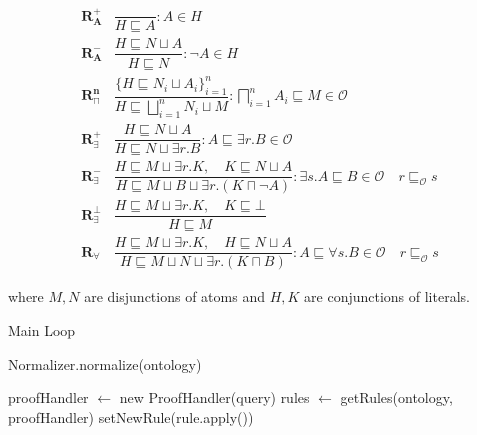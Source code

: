\documentclass[titlepage]{article}
\begin{document}
\begin{align}
  \mathbf{R^{+}_A} & \dfrac{}{H\sqsubseteq A} : A \in H \label{rules:RPlusA}\\
  \mathbf{R^{-}_A} & \dfrac{H \sqsubseteq N \sqcup A}{H \sqsubseteq N} : \neg A \in H  \label{rules:RMinusA}\\ 
  \mathbf{R^{n}_{\sqcap}} & \dfrac{\{H \sqsubseteq N_i \sqcup A_i \}^{n}_{i=1}}{H \sqsubseteq \bigsqcup^{n}_{i=1} N_i \sqcup M} : \bigsqcap^{n}_{i=1} A_i \sqsubseteq M \in \mathcal{O} \label{rules:RNAnd} \\
  \mathbf{R^+_{\exists}} & \dfrac{H \sqsubseteq N \sqcup A }{ H \sqsubseteq N \sqcup \exists r.B} : A \sqsubseteq \exists r.B \in \mathcal{O} \label{rules:RPlusExists}\\
  \mathbf{R^-_{\exists}} & \dfrac{H \sqsubseteq M \sqcup \exists r.K,\quad K \sqsubseteq N \sqcup A}{H \sqsubseteq M \sqcup B \sqcup \exists r.(K \sqcap \neg A)} : \exists s.A \sqsubseteq B \in \mathcal{O} \quad r \sqsubseteq_{\mathcal{O}} s \label{rules:RMinusExists}\\
  \mathbf{R^\bot_{\exists}} & \dfrac{H \sqsubseteq M \sqcup \exists r.K,\quad K \sqsubseteq \bot}{H \sqsubseteq M} \label{rules:RBotExists}\\
  \mathbf{R_{\forall}} & \dfrac{H \sqsubseteq M \sqcup \exists r.K,\quad H \sqsubseteq N \sqcup A}{H \sqsubseteq M \sqcup N \sqcup \exists r.(K \sqcap B)} : A \sqsubseteq \forall s.B \in \mathcal{O} \quad r \sqsubseteq_{\mathcal{O}} s \label{rules:RForall}
\end{align}



where $M,N$ are disjunctions of atoms and $H,K$ are conjunctions of literals.

\begin{algorithm}
  \caption{Main Loop}\label{alg:cap}
\begin{algorithmic}
  \State Normalizer.normalize(ontology)

  \State proofHandler $\gets$ new ProofHandler(query)
  \State rules $\gets$ getRules(ontology, proofHandler) 
    \State setNewRule(rule.apply())
  \EndFor
  \EndWhile
  \EndProcedure
\end{algorithmic}
\end{algorithm}
\end{document}
